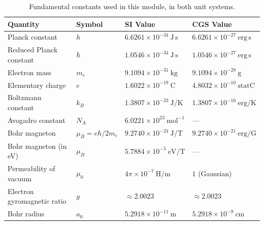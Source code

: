 \documentclass[11pt,a4paper]{article}
\begin{document}
\begin{table}[ht]
\centering
\small
\renewcommand{\arraystretch}{1.2}
\begin{tabular}{llll}
\toprule
\textbf{Quantity} & \textbf{Symbol} & \textbf{SI Value} & \textbf{CGS Value} \\
\midrule
Planck constant & $h$ & $6.6261\times10^{-34}\ \mathrm{J\,s}$ & $6.6261\times10^{-27}\ \mathrm{erg\,s}$ \\
Reduced Planck constant & $\hbar$ & $1.0546\times10^{-34}\ \mathrm{J\,s}$ & $1.0546\times10^{-27}\ \mathrm{erg\,s}$ \\
Electron mass & $m_e$ & $9.1094\times10^{-31}\ \mathrm{kg}$ & $9.1094\times10^{-28}\ \mathrm{g}$ \\
Elementary charge & $e$ & $1.6022\times10^{-19}\ \mathrm{C}$ & $4.8032\times10^{-10}\ \mathrm{statC}$ \\
Boltzmann constant & $k_B$ & $1.3807\times10^{-23}\ \mathrm{J/K}$ & $1.3807\times10^{-16}\ \mathrm{erg/K}$ \\
Avogadro constant & $N_A$ & $6.0221\times10^{23}\ \mathrm{mol^{-1}}$ & --- \\
Bohr magneton & $\mu_B = e\hbar/2m_e$ & $9.2740\times10^{-24}\ \mathrm{J/T}$ & $9.2740\times10^{-21}\ \mathrm{erg/G}$ \\
Bohr magneton (in eV) & $\mu_B$ & $5.7884\times10^{-5}\ \mathrm{eV/T}$ & --- \\
Permeability of vacuum & $\mu_0$ & $4\pi\times10^{-7}\ \mathrm{H/m}$ & $1$ (Gaussian) \\
Electron gyromagnetic ratio & $g$ & $\approx 2.0023$ & $\approx 2.0023$ \\
Bohr radius & $a_0$ & $5.2918\times10^{-11}\ \mathrm{m}$ & $5.2918\times10^{-9}\ \mathrm{cm}$ \\
\bottomrule
\end{tabular}
\caption{Fundamental constants used in this module, in both unit systems.}
\label{tab:constants}
\end{table}
\end{document}
